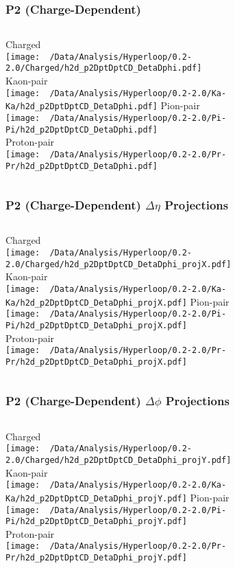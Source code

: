 \documentclass{beamer}
\begin{document}
\begin{frame}
	\frametitle{P2 (Charge-Dependent)}
	\begin{columns}
		\centering
		Charged\\
		\texttt{[image: ~/Data/Analysis/Hyperloop/0.2-2.0/Charged/h2d\_p2DptDptCD\_DetaDphi.pdf]}\\Kaon-pair\\
		\texttt{[image: ~/Data/Analysis/Hyperloop/0.2-2.0/Ka-Ka/h2d\_p2DptDptCD\_DetaDphi.pdf]}
		\centering
		Pion-pair\\
		\texttt{[image: ~/Data/Analysis/Hyperloop/0.2-2.0/Pi-Pi/h2d\_p2DptDptCD\_DetaDphi.pdf]}\\Proton-pair\\
		\texttt{[image: ~/Data/Analysis/Hyperloop/0.2-2.0/Pr-Pr/h2d\_p2DptDptCD\_DetaDphi.pdf]}
	\end{columns}
\end{frame}
\begin{frame}
	\frametitle{P2 (Charge-Dependent) $\Delta\eta$ Projections}
	\begin{columns}
		\column{0.5\textwidth}
		\centering
		Charged\\
		\texttt{[image: ~/Data/Analysis/Hyperloop/0.2-2.0/Charged/h2d\_p2DptDptCD\_DetaDphi\_projX.pdf]}\\Kaon-pair\\
		\texttt{[image: ~/Data/Analysis/Hyperloop/0.2-2.0/Ka-Ka/h2d\_p2DptDptCD\_DetaDphi\_projX.pdf]}
		\column{0.5\textwidth}
		\centering
		Pion-pair\\
		\texttt{[image: ~/Data/Analysis/Hyperloop/0.2-2.0/Pi-Pi/h2d\_p2DptDptCD\_DetaDphi\_projX.pdf]}\\Proton-pair\\
		\texttt{[image: ~/Data/Analysis/Hyperloop/0.2-2.0/Pr-Pr/h2d\_p2DptDptCD\_DetaDphi\_projX.pdf]}
	\end{columns}
\end{frame}
\begin{frame}
	\frametitle{P2 (Charge-Dependent) $\Delta\phi$ Projections}
	\begin{columns}
		\centering
		Charged\\
		\texttt{[image: ~/Data/Analysis/Hyperloop/0.2-2.0/Charged/h2d\_p2DptDptCD\_DetaDphi\_projY.pdf]}\\Kaon-pair\\
		\texttt{[image: ~/Data/Analysis/Hyperloop/0.2-2.0/Ka-Ka/h2d\_p2DptDptCD\_DetaDphi\_projY.pdf]}
		\centering
		Pion-pair\\
		\texttt{[image: ~/Data/Analysis/Hyperloop/0.2-2.0/Pi-Pi/h2d\_p2DptDptCD\_DetaDphi\_projY.pdf]}\\Proton-pair\\
		\texttt{[image: ~/Data/Analysis/Hyperloop/0.2-2.0/Pr-Pr/h2d\_p2DptDptCD\_DetaDphi\_projY.pdf]}
	\end{columns}
\end{frame}
\end{document}
